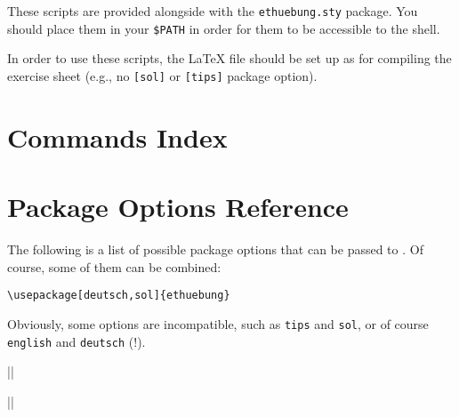 \documentclass[11pt,a4paper]{article}
\begin{document}
These scripts are provided alongside with the \texttt{ethuebung.sty} package. You should
place them in your \texttt{\$PATH} in order for them to be accessible to the shell.

\begin{pkgnotice}
  In order to use these scripts, the \LaTeX{} file should be set up as for compiling the
  exercise sheet (e.g., no \texttt{[sol]} or \texttt{[tips]} package option).
\end{pkgnotice}




\pkgendindex

\section{Commands Index}
\label{sec:AllCommands}

\pkgshowcmdindex


\section{Package Options Reference}
\label{sec:PackageOptions}

The following is a list of possible package options that can be passed to \ethuebung. Of
course, some of them can be combined:
\begin{pkgverbatim}
\begin{verbatim}
\usepackage[deutsch,sol]{ethuebung}
\end{verbatim}
\end{pkgverbatim}

Obviously, some options are incompatible, such as \texttt{tips} and \texttt{sol}, or
of course \texttt{english} and \texttt{deutsch} (!).



\verbdef\ueblangdeutsch||

\verbdef\ueblangenglish||
\end{document}
